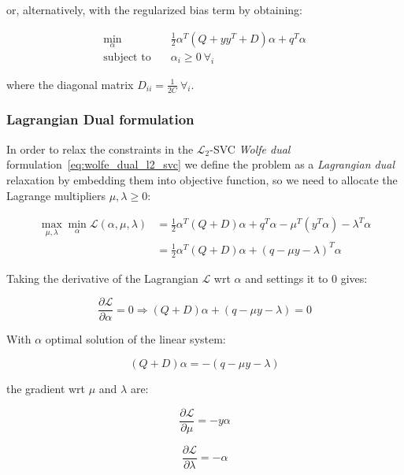 or, alternatively, with the regularized bias term by obtaining:

\begin{equation} \label{eq:reg_bias_wolfe_dual_l2_svc}
    \begin{aligned}
        \min_{\alpha} \quad & \frac{1}{2}\alpha^T (Q + yy^T + D) \alpha + q^T \alpha \\
            \text{subject to} \quad & \alpha_i \geq 0 \ \forall_i
    \end{aligned}
\end{equation}

where the diagonal matrix $\displaystyle D_{ii} = \frac{1}{2C} \ \forall_i$.

\subsubsection{Lagrangian Dual formulation}

In order to relax the constraints in the $\mathcal{L}_2$-SVC \emph{Wolfe dual} formulation~\eqref{eq:wolfe_dual_l2_svc} we define the problem as a \emph{Lagrangian dual} relaxation by embedding them into objective function, so we need to allocate the Lagrange multipliers $\mu, \lambda \geq 0$:

\begin{equation} \label{eq:l2_svc_lagrangian_dual}
	\begin{aligned}
		    \max_{\mu,\lambda} \min_{\alpha} \mathcal{L}(\alpha,\mu,\lambda) &= \frac{1}{2} \alpha^T (Q+D)\alpha+q^T\alpha - \mu^T (y^T \alpha) - \lambda^T \alpha \\
    &= \frac{1}{2} \alpha^T (Q+D)\alpha + (q - \mu y - \lambda)^T \alpha
	\end{aligned}
\end{equation}

Taking the derivative of the Lagrangian $\mathcal{L}$ wrt $\alpha$ and settings it to 0 gives:

\begin{equation} \label{eq:l2_svc_lagrangian_der_a}
	\frac{\partial \mathcal{L}}{\partial \alpha}=0\Rightarrow (Q+D) \alpha + (q - \mu y - \lambda) = 0
\end{equation}

With $\alpha$ optimal solution of the linear system:

\begin{equation} \label{eq:l2_svc_lagrangian_sol}
    (Q+D) \alpha = - (q - \mu y - \lambda)
\end{equation}

the gradient wrt $\mu$ and $\lambda$ are:

\begin{equation} \label{eq:l2_svc_lagrangian_der_mu}
	\frac{\partial \mathcal{L}}{\partial \mu}=-y \alpha
\end{equation}

\begin{equation} \label{eq:l2_svc_lagrangian_der_lambda}
    \frac{\partial \mathcal{L}}{\partial \lambda}=-\alpha
\end{equation}